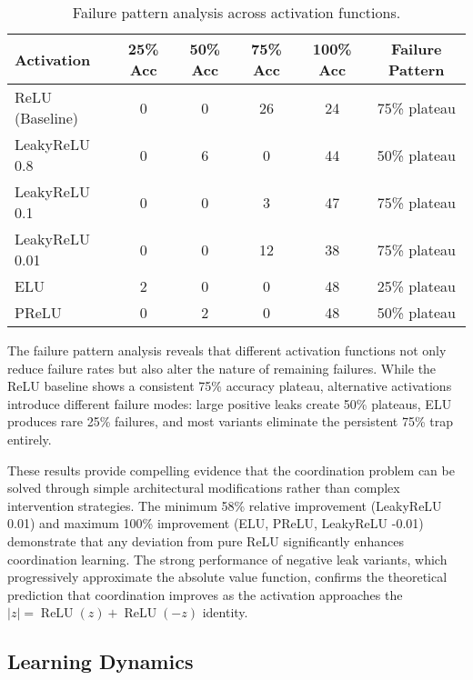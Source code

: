 \begin{table}[ht]
\centering
\caption{Failure pattern analysis across activation functions.}
\label{tab:relu1-activation-failures}
\begin{tabular}{lccccc}
\toprule
Activation & 25\% Acc & 50\% Acc & 75\% Acc & 100\% Acc & Failure Pattern \\
\midrule
ReLU (Baseline) & 0 & 0 & 26 & 24 & 75\% plateau \\
LeakyReLU 0.8 & 0 & 6 & 0 & 44 & 50\% plateau \\
LeakyReLU 0.1 & 0 & 0 & 3 & 47 & 75\% plateau \\
LeakyReLU 0.01 & 0 & 0 & 12 & 38 & 75\% plateau \\
ELU & 2 & 0 & 0 & 48 & 25\% plateau \\
PReLU & 0 & 2 & 0 & 48 & 50\% plateau \\
\bottomrule
\end{tabular}
\end{table}

The failure pattern analysis reveals that different activation functions not only reduce failure rates but also alter the nature of remaining failures. While the ReLU baseline shows a consistent 75\% accuracy plateau, alternative activations introduce different failure modes: large positive leaks create 50\% plateaus, ELU produces rare 25\% failures, and most variants eliminate the persistent 75\% trap entirely.

These results provide compelling evidence that the coordination problem can be solved through simple architectural modifications rather than complex intervention strategies. The minimum 58\% relative improvement (LeakyReLU 0.01) and maximum 100\% improvement (ELU, PReLU, LeakyReLU -0.01) demonstrate that any deviation from pure ReLU significantly enhances coordination learning. The strong performance of negative leak variants, which progressively approximate the absolute value function, confirms the theoretical prediction that coordination improves as the activation approaches the $|z| = \operatorname{ReLU}(z) + \operatorname{ReLU}(-z)$ identity.


\subsection*{Learning Dynamics}

